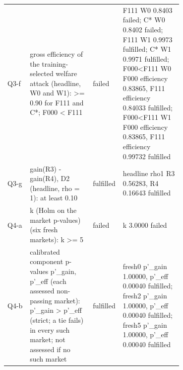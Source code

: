 \begin{tabular}{@{}lp{0.36\linewidth}lp{0.34\linewidth}@{}}
Q3-f & gross efficiency of the training-selected welfare attack (headline, W0 and W1): >= 0.90 for F111 and C*; F000 < F111 & failed & F111 W0 0.8403 failed; C* W0 0.8402 failed; F111 W1 0.9973 fulfilled; C* W1 0.9971 fulfilled; F000<F111 W0 F000 efficiency 0.83865, F111 efficiency 0.84033 fulfilled; F000<F111 W1 F000 efficiency 0.83865, F111 efficiency 0.99732 fulfilled \\
Q3-g & gain(R3) - gain(R4), D2 (headline, rho = 1): at least 0.10 & fulfilled & headline rho1 R3 0.56283, R4 0.16643 fulfilled \\
Q4-a & k (Holm on the market p-values) (six fresh markets): k >= 5 & failed & k 3.0000 failed \\
Q4-b & calibrated component p-values p'\_gain, p'\_eff (each assessed non-passing market): p'\_gain > p'\_eff (strict; a tie fails) in every such market; not assessed if no such market & fulfilled & fresh0 p'\_gain 1.00000, p'\_eff 0.00040 fulfilled; fresh2 p'\_gain 1.00000, p'\_eff 0.00040 fulfilled; fresh5 p'\_gain 1.00000, p'\_eff 0.00040 fulfilled \\
\bottomrule\end{tabular}
